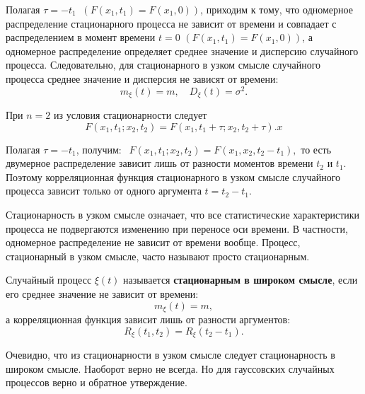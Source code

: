     Полагая $\tau=-t_1$ $\  \left(F\left(x_1, t_1\right)=F\left(x_1, 0\right)\right) $, приходим к тому, что одномерное распределение стационарного процесса не зависит от времени и совпадает с распределением в момент времени $t=0$ $ \left(F\left(x_1, t_1\right)=F\left(x_1, 0\right)\right) $, а одномерное распределение определяет среднее значение и дисперсию случайного процесса. Следовательно, для стационарного в узком смысле случайного процесса среднее значение и дисперсия не зависят от времени:
    $$
        m_{\xi}(t)=m, \quad D_{\xi}(t)=\sigma^2 .
    $$

    При $n=2$ из условия стационарности следует
    $$
    F\left(x_1, t_1 ; x_2, t_2\right)=F\left(x_1, t_1+\tau ; x_2, t_2+\tau\right) .
x	    $$
    
    Полагая $\tau=-t_1$, получим: 
    $\ \  F\left(x_1, t_1 ; x_2, t_2\right)=F\left(x_1, x_2, t_2-t_1\right), $
    то есть двумерное распределение зависит лишь от разности моментов времени $t_2$ и $t_1$. Поэтому корреляционная функция стационарного в узком смысле случайного процесса зависит только от одного аргумента $t=t_2-t_1$.

    Стационарность в узком смысле означает, что все статистические характеристики процесса не подвергаются изменению при переносе оси времени. В частности, одномерное распределение не зависит от времени вообще. Процесс, стационарный в узком смысле, часто называют просто стационарным.


   \begin{definition}\label{smd_def_4} Случайный процесс $\xi(t)$ называется \textbf{стационарным в широком смысле}, если его среднее значение не зависит от времени:
    \begin{equation}
        m_{\xi}(t) = m ,
        \label{14.3}
    \end{equation}
    а корреляционная функция зависит лишь от разности аргументов:
    \begin{equation}
    R_{\xi}\left(t_1, t_2\right)=R_{\xi}\left(t_2-t_1\right) .
        \label{14.4}
    \end{equation}
	\end{definition}
    
    Очевидно, что из стационарности в узком смысле следует стационарность в широком смысле. Наоборот верно не всегда. Но для гауссовских случайных процессов верно и обратное утверждение.
    
